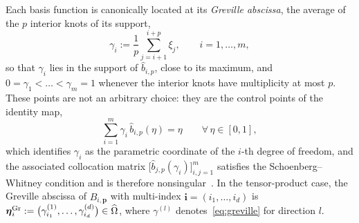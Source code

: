 \documentclass{article}
\newcommand{\vect}[1]{\boldsymbol{#1}}
\newcommand{\refdom}{\widehat{\Omega}}            %
\newcommand{\bsuni}[2]{\widehat{b}_{#1,#2}}      %
\newcommand{\Bref}[2]{\widehat{B}_{#1,#2}}       %
\theoremstyle{plain}
\numberwithin{equation}{section}
\begin{document}
Each basis function is canonically located at its \emph{Greville abscissa}, the
average of the $p$ interior knots of its support,
\begin{equation}
    \gamma_i := \frac{1}{p} \sum_{j=i+1}^{i+p} \xi_j,
    \qquad i = 1, \dots, m,
    \label{eq:greville}
\end{equation}
so that $\gamma_i$ lies in the support of $\bsuni{i}{p}$, close to its maximum,
and $0 = \gamma_1 < \dots < \gamma_m = 1$ whenever the interior knots have
multiplicity at most $p$.  These points are not an arbitrary choice: they are the
control points of the identity map,
\begin{equation}
    \sum_{i=1}^{m} \gamma_i\, \bsuni{i}{p}(\eta) = \eta
    \qquad \forall\, \eta \in [0,1],
    \label{eq:greville-identity}
\end{equation}
which identifies $\gamma_i$ as the parametric coordinate of the $i$-th degree of
freedom, and the associated collocation matrix
$\bigl[\bsuni{j}{p}(\gamma_i)\bigr]_{i,j=1}^{m}$ satisfies the
Schoenberg--Whitney condition and is therefore
nonsingular~\cite{de1978practical}.  In the tensor-product case, the Greville
abscissa of $\Bref{i}{\vect{p}}$ with multi-index $\vect{i} = (i_1, \dots, i_d)$
is $\vect\eta_i^{\rm Gr} := \bigl(\gamma_{i_1}^{(1)}, \dots,
    \gamma_{i_d}^{(d)}\bigr) \in \refdom$, where $\gamma^{(l)}$
denotes~\eqref{eq:greville} for direction $l$.
\end{document}
